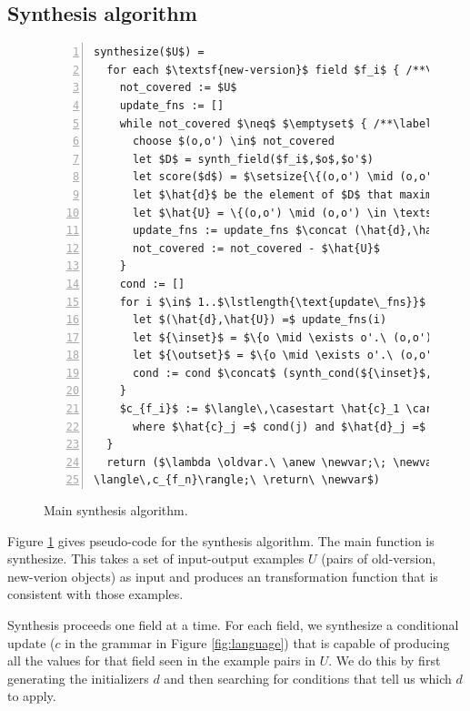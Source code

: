 \documentclass[natbib]{sigplanconf}
\begin{document}
\subsection{Synthesis algorithm}

\begin{figure}
\hspace*{.2in}
\begin{minipage}{4.3in}
\begin{lstlisting}[numbers=left]
synthesize($U$) =
  for each $\textsf{new-version}$ field $f_i$ { /**\label{line:path1}*/
    not_covered := $U$
    update_fns := []
    while not_covered $\neq$ $\emptyset$ { /**\label{line:not-covered-loop}*/
      choose $(o,o') \in$ not_covered
      let $D$ = synth_field($f_i$,$o$,$o'$)
      let score($d$) = $\setsize{\{(o,o') \mid (o,o') \in \textsf{not\_covered} \wedge o'.f = d(o)\}}$
      let $\hat{d}$ be the element of $D$ that maximizes score
      let $\hat{U} = \{(o,o') \mid (o,o') \in \textsf{not\_covered} \wedge o'.f = \hat{d}(o)\}$
      update_fns := update_fns $\concat (\hat{d},\hat{U})$
      not_covered := not_covered - $\hat{U}$
    }
    cond := []
    for i $\in$ 1..$\lstlength{\text{update\_fns}}$ { /**\label{line:discover-condition-loop}*/
      let $(\hat{d},\hat{U}) =$ update_fns(i)
      let ${\inset}$ = $\{o \mid \exists o'.\ (o,o') \in U \wedge (o,o') \in \hat{U}_i\}$
      let ${\outset}$ = $\{o \mid \exists o'.\ (o,o') \in U \wedge (o,o') \not\in \hat{U}_i\}$
      cond := cond $\concat$ (synth_cond(${\inset}$,${\outset}$))
    }
    $c_{f_i}$ := $\langle\,\casestart \hat{c}_1 \carrow \hat{d}_1, \ldots, \hat{c}_n \carrow \hat{d}_n \caseend\,\rangle$
      where $\hat{c}_j =$ cond(j) and $\hat{d}_j =$ update_fns(j)(0)
  }
  return ($\lambda \oldvar.\ \anew \newvar;\; \newvar.f_1 := \langle\,c_{f_1}\rangle;\ \ldots;\ \newvar.f_n :=
\langle\,c_{f_n}\rangle;\ \return\ \newvar$)
\end{lstlisting}
\end{minipage}
\caption{Main synthesis algorithm.\label{fig:synthesis}}
\end{figure}

Figure \ref{fig:synthesis} gives pseudo-code for the synthesis
algorithm.  The main function is \textsf{synthesize}.  This takes a
set of input-output examples $U$ (pairs of old-version, new-verion objects)
as input and produces an transformation function that
is consistent with those examples.

Synthesis proceeds one field at a time.  For each field, we synthesize a
conditional update ($c$ in the grammar in Figure \ref{fig:language}) that
is capable of producing all the values for that field seen in the example
pairs in $U$.  We do this by first generating the initializers $d$ and then
searching for conditions that tell us which $d$ to apply.
\end{document}
